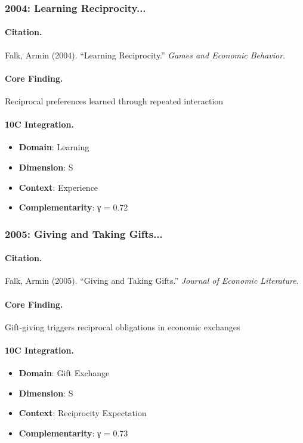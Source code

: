 \subsubsection{2004: Learning Reciprocity...}

\paragraph{Citation.}
Falk, Armin (2004). ``Learning Reciprocity.''
\textit{Games and Economic Behavior}.

\paragraph{Core Finding.}
Reciprocal preferences learned through repeated interaction

\paragraph{10C Integration.}
\begin{itemize}[nosep]
  \item \textbf{Domain}: Learning
  \item \textbf{Dimension}: S
  \item \textbf{Context}: Experience
  \item \textbf{Complementarity}: γ = 0.72
\end{itemize}


\subsubsection{2005: Giving and Taking Gifts...}

\paragraph{Citation.}
Falk, Armin (2005). ``Giving and Taking Gifts.''
\textit{Journal of Economic Literature}.

\paragraph{Core Finding.}
Gift-giving triggers reciprocal obligations in economic exchanges

\paragraph{10C Integration.}
\begin{itemize}[nosep]
  \item \textbf{Domain}: Gift Exchange
  \item \textbf{Dimension}: S
  \item \textbf{Context}: Reciprocity Expectation
  \item \textbf{Complementarity}: γ = 0.73
\end{itemize}


